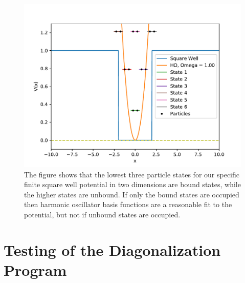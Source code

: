 \documentclass[../main.tex]{subfiles}
\begin{document}
\begin{figure}
\centering
\includegraphics[width=\linewidth]{figures/SW_Energy_Levels}
\caption{The figure shows that the lowest three particle states for our specific finite square well potential in two dimensions are bound states, while the higher states are unbound. If only the bound states are occupied then harmonic oscillator basis functions are a reasonable fit to the potential, but not if unbound states are occupied.}
\label{fig: FSW_energy_levels}
\end{figure}

\section{Testing of the Diagonalization Program}
\end{document}
